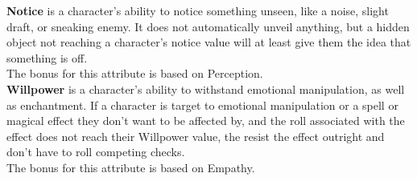 \textbf{Notice}\label{stat:notice} is a character's ability to notice something unseen, like a noise, slight draft, or sneaking enemy.
It does not automatically unveil anything, but a hidden object not reaching a character's notice value will at least give them the idea that something is off.\\
The bonus for this attribute is based on Perception.\\

\textbf{Willpower}\label{stat:willpower} is a character's ability to withstand emotional manipulation, as well as enchantment.
If a character is target to emotional manipulation or a spell or magical effect they don't want to be affected by, and the roll associated with the effect does not reach their Willpower value, the resist the effect outright and don't have to roll competing checks.\\
The bonus for this attribute is based on Empathy.\\